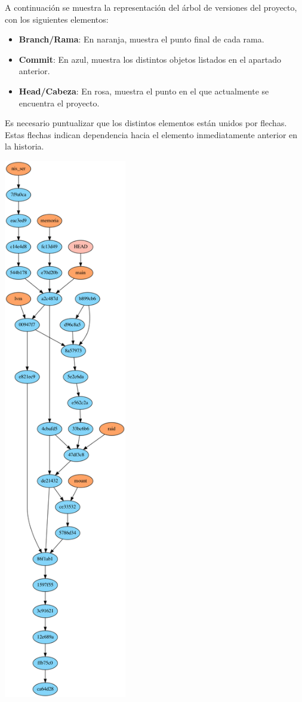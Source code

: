 A continuación se muestra la representación del árbol de versiones del proyecto, con los siguientes elementos:
\begin{itemize}
    \item \textbf{Branch/Rama}: En naranja, muestra el punto final de cada rama.
    \item \textbf{Commit}: En azul, muestra los distintos objetos listados en el apartado anterior.
    \item \textbf{Head/Cabeza}: En rosa, muestra el punto en el que actualmente se encuentra el proyecto.
\end{itemize}
Es necesario puntualizar que los distintos elementos están unidos por flechas. Estas flechas indican dependencia hacia el elemento inmediatamente anterior en la historia.
\begin{multicols}{2}
    \includegraphics[trim={0 30cm 0 0}, clip, width=0.4\textwidth]{includes/graph.png}


\end{multicols}
